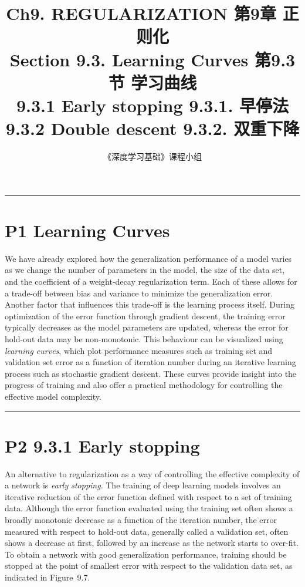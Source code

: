 \documentclass{article}
\title{Ch9. REGULARIZATION \hfill 第9章 正则化 \\ 
Section 9.3. Learning Curves \hfill 第9.3节 学习曲线 \\ 
9.3.1 Early stopping \hfill 9.3.1. 早停法\\
9.3.2 Double descent \hfill 9.3.2. 双重下降}
\author{《深度学习基础》课程小组}
\begin{document}
\maketitle

\setlength{\parindent}{0pt} %
\setlength{\parskip}{1.5em} %

\noindent\rule{\linewidth}{0.4pt}

\section{P1 Learning Curves}
We have already explored how the generalization performance of a model varies as we change the number of parameters in the model, the size of the data set, and the coefficient of a weight-decay regularization term. Each of these allows for a trade-off between bias and variance to minimize the generalization error. Another factor that influences this trade-off is the learning process itself. During optimization of the error function through gradient descent, the training error typically decreases as the model parameters are updated, whereas the error for hold-out data may be non-monotonic. This behaviour can be visualized using \emph{learning curves}, which plot performance measures such as training set and validation set error as a function of iteration number during an iterative learning process such as stochastic gradient descent. These curves provide insight into the progress of training and also offer a practical methodology for controlling the effective model complexity.

\noindent\rule{\linewidth}{0.4pt}

\section{P2 9.3.1 Early stopping}

An alternative to regularization as a way of controlling the effective complexity of a network is \emph{early stopping}. The training of deep learning models involves an iterative reduction of the error function defined with respect to a set of training data. Although the error function evaluated using the training set often shows a broadly monotonic decrease as a function of the iteration number, the error measured with respect to hold-out data, generally called a validation set, often shows a decrease at first, followed by an increase as the network starts to over-fit. To obtain a network with good generalization performance, training should be stopped at the point of smallest error with respect to the validation data set, as indicated in Figure~9.7.
\end{document}
